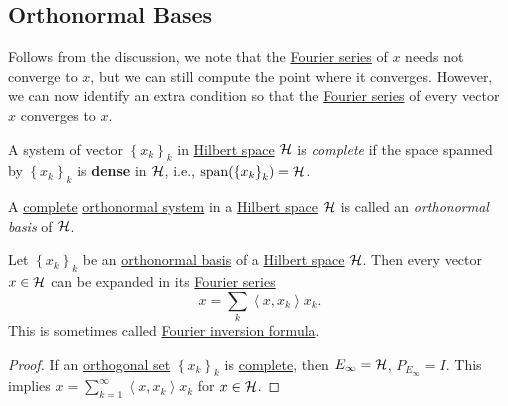 \subsection{Orthonormal Bases}
Follows from the discussion, we note that the \hyperref[def:Fourier-series]{Fourier series} of \(x\) needs not converge to \(x\), but we can still compute the point where it converges. However, we can now identify an extra condition so that the \hyperref[def:Fourier-series]{Fourier series} of every vector \(x\) converges to \(x\).

\begin{definition}\label{def:complete-system}
	A system of vector \(\left\{ x_k\right\}_k\) in \hyperref[def:Hilbert-space]{Hilbert space} \(\mathcal{\MakeUppercase{h}} \) is \emph{complete} if the space spanned by \(\left\{ x_k\right\}_k\) is \textbf{dense} in \(\mathcal{\MakeUppercase{h}} \), i.e., \(\mathop{\mathrm{span}}(\left\{ x_k \right\} _k) = \mathcal{\MakeUppercase{h}} \).
\end{definition}

\begin{definition}\label{def:orthonormal-basis}
	A \hyperref[def:complete-system]{complete} \hyperref[def:orthonormal-system]{orthonormal system} in a \hyperref[def:Hilbert-space]{Hilbert space} \(\mathcal{\MakeUppercase{h}} \) is called an \emph{orthonormal basis} of \(\mathcal{\MakeUppercase{h}} \).
\end{definition}

\begin{theorem}\label{thm:Fourier-expansion}
	Let \(\left\{ x_k \right\} _k\) be an \hyperref[def:orthonormal-basis]{orthonormal basis} of a \hyperref[def:Hilbert-space]{Hilbert space} \(\mathcal{\MakeUppercase{h}} \). Then every vector \(x\in \mathcal{\MakeUppercase{h}} \) can be expanded in its \hyperref[def:Fourier-series]{Fourier series}
	\[
		x = \sum_{k} \left\langle x, x_k \right\rangle x_k.
	\]
	This is sometimes called \href{https://en.wikipedia.org/wiki/Fourier_inversion_theorem}{Fourier inversion formula}.
\end{theorem}
\begin{proof}
	If an \hyperref[def:orthogonal-system]{orthogonal set} \(\left\{ x_{k} \right\}_k \) is \hyperref[def:complete-system]{complete}, then \(E_\infty = \mathcal{\MakeUppercase{h}} \), \(P_{E_\infty } = I\). This implies \(x = \sum_{k=1}^{\infty} \left\langle x, x_{k}  \right\rangle x_{k}\) for \(x\in \mathcal{\MakeUppercase{h}} \).
\end{proof}

